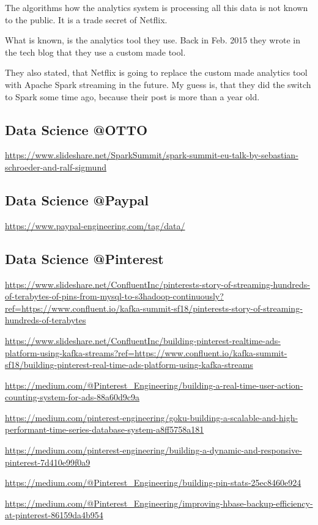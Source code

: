 \documentclass[12pt]{scrartcl} %
\begin{document}
The algorithms how the analytics system is processing all this data is not known to the public. It is a trade secret of Netflix.

What is known, is the analytics tool they use. Back in Feb. 2015 they wrote in the tech blog that they use a custom made tool.

They also stated, that Netflix is going to replace the custom made analytics tool with Apache Spark streaming in the future. My guess is, that they did the switch to Spark some time ago, because their post is more than a year old.

\subsection{Data Science @OTTO}
\url{https://www.slideshare.net/SparkSummit/spark-summit-eu-talk-by-sebastian-schroeder-and-ralf-sigmund}

\subsection{Data Science @Paypal}
\url{https://www.paypal-engineering.com/tag/data/}

\subsection{Data Science @Pinterest}
\url{https://www.slideshare.net/ConfluentInc/pinterests-story-of-streaming-hundreds-of-terabytes-of-pins-from-mysql-to-s3hadoop-continuously?ref=https://www.confluent.io/kafka-summit-sf18/pinterests-story-of-streaming-hundreds-of-terabytes}

\url{https://www.slideshare.net/ConfluentInc/building-pinterest-realtime-ads-platform-using-kafka-streams?ref=https://www.confluent.io/kafka-summit-sf18/building-pinterest-real-time-ads-platform-using-kafka-streams}

\url{https://medium.com/@Pinterest_Engineering/building-a-real-time-user-action-counting-system-for-ads-88a60d9c9a}

\url{https://medium.com/pinterest-engineering/goku-building-a-scalable-and-high-performant-time-series-database-system-a8ff5758a181}

\url{https://medium.com/pinterest-engineering/building-a-dynamic-and-responsive-pinterest-7d410e99f0a9}

\url{https://medium.com/@Pinterest_Engineering/building-pin-stats-25ec8460e924}

\url{https://medium.com/@Pinterest_Engineering/improving-hbase-backup-efficiency-at-pinterest-86159da4b954}
\end{document}
